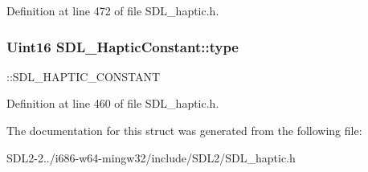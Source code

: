 Definition at line 472 of file S\+D\+L\+\_\+haptic.\+h.

\hypertarget{structSDL__HapticConstant_a5cb31202803a8bc1be95fcede5ac8afb}{
\subsubsection[{type}]{\setlength{\rightskip}{0pt plus 5cm}Uint16 S\+D\+L\+\_\+\+Haptic\+Constant\+::type}}\label{structSDL__HapticConstant_a5cb31202803a8bc1be95fcede5ac8afb}
\+::\+S\+D\+L\+\_\+\+H\+A\+P\+T\+I\+C\+\_\+\+C\+O\+N\+S\+T\+A\+N\+T 

Definition at line 460 of file S\+D\+L\+\_\+haptic.\+h.



The documentation for this struct was generated from the following file\+:\begin{DoxyCompactItemize}
\item 
S\+D\+L2-\/2../i686-\/w64-\/mingw32/include/\+S\+D\+L2/S\+D\+L\+\_\+haptic.\+h\end{DoxyCompactItemize}
